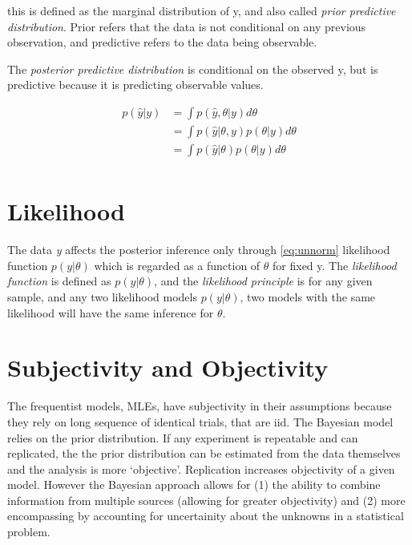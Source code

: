 \documentclass[
]{book}
\theoremstyle{definition}
\theoremstyle{definition}
\theoremstyle{definition}
\theoremstyle{definition}
\theoremstyle{remark}
\begin{document}
this is defined as the marginal distribution of y, and also called \emph{prior predictive distribution}. Prior refers that the data is not conditional on any previous observation, and predictive refers to the data being observable.

The \emph{posterior predictive distribution} is conditional on the observed y, but is predictive because it is predicting observable values.

\begin{equation}
\begin{split}
p(\hat{y} | y) &= \int p(\hat{y}, \theta | y) d\theta \\
&= \int p(\hat{y} |\theta, y) p(\theta|y) d\theta \\
& = \int p(\hat{y}| \theta) p(\theta | y) d\theta \\
\end{split}
\label{eq:postpred}
\end{equation}

\hypertarget{likelihood}{%
\section*{Likelihood}\label{likelihood}}

The data \emph{y} affects the posterior inference only through \eqref{eq:unnorm} likelihood function \(p(y| \theta)\) which is regarded as a function of \(\theta\) for fixed y. The \emph{likelihood function} is defined as \(p(y | \theta)\), and the \emph{likelihood principle} is for any given sample, and any two likelihood models \(p(y | \theta)\), two models with the same likelihood will have the same inference for \(\theta\).

\hypertarget{subjectivity-and-objectivity}{%
\section*{Subjectivity and Objectivity}\label{subjectivity-and-objectivity}}

The frequentist models, MLEs, have subjectivity in their assumptions because they rely on long sequence of identical trials, that are iid. The Bayesian model relies on the prior distribution. If any experiment is repeatable and can replicated, the the prior distribution can be estimated from the data themselves and the analysis is more `objective'. Replication increases objectivity of a given model. However the Bayesian approach allows for (1) the ability to combine information from multiple sources (allowing for greater objectivity) and (2) more encompassing by accounting for uncertainity about the unknowns in a statistical problem.
\end{document}
